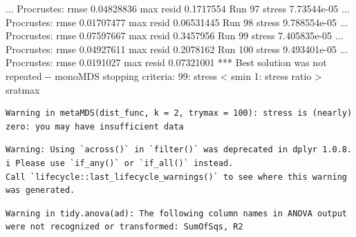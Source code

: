 \documentclass[
]{book}
\newenvironment{Shaded}{\begin{snugshade}}{\end{snugshade}}
\newcommand{\NormalTok}[1]{#1}
\begin{document}
\begin{Shaded}
\begin{Highlighting}[]
\NormalTok{... Procrustes: rmse 0.04828836  max resid 0.1717554 }
\NormalTok{Run 97 stress 7.73544e{-}05 }
\NormalTok{... Procrustes: rmse 0.01707477  max resid 0.06531445 }
\NormalTok{Run 98 stress 9.788554e{-}05 }
\NormalTok{... Procrustes: rmse 0.07597667  max resid 0.3457956 }
\NormalTok{Run 99 stress 7.405835e{-}05 }
\NormalTok{... Procrustes: rmse 0.04927611  max resid 0.2078162 }
\NormalTok{Run 100 stress 9.493401e{-}05 }
\NormalTok{... Procrustes: rmse 0.0191027  max resid 0.07321001 }
\NormalTok{*** Best solution was not repeated {-}{-} monoMDS stopping criteria:}
\NormalTok{    99: stress \textless{} smin}
\NormalTok{     1: stress ratio \textgreater{} sratmax}
\end{Highlighting}
\end{Shaded}

\begin{verbatim}
Warning in metaMDS(dist_func, k = 2, trymax = 100): stress is (nearly) zero: you may have insufficient data
\end{verbatim}

\begin{verbatim}
Warning: Using `across()` in `filter()` was deprecated in dplyr 1.0.8.
i Please use `if_any()` or `if_all()` instead.
Call `lifecycle::last_lifecycle_warnings()` to see where this warning was generated.
\end{verbatim}

\begin{verbatim}
Warning in tidy.anova(ad): The following column names in ANOVA output were not recognized or transformed: SumOfSqs, R2
\end{verbatim}
\end{document}
